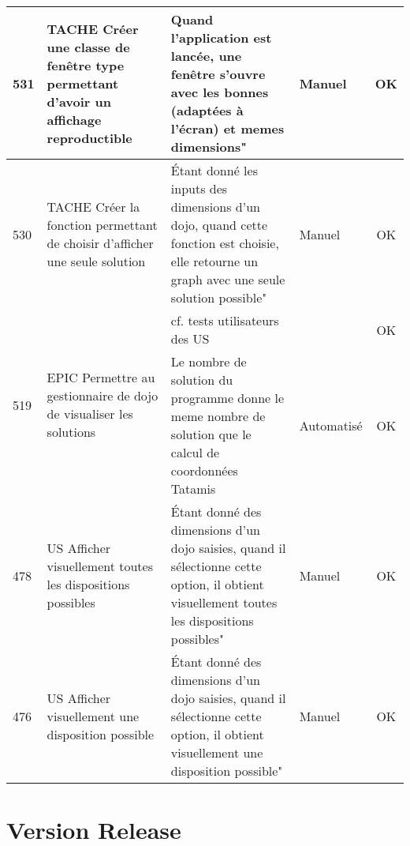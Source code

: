 \begin{adjustwidth}{-1.5cm}{0cm}
{\begin{tabular}{|m{0.6cm}|m{5.5cm}|m{8cm}|m{2cm}|c|}
            531                      & TACHE Créer une classe de fenêtre type permettant d'avoir un affichage reproductible            & Quand l'application est lancée, une fenêtre s'ouvre avec les bonnes (adaptées à l'écran) et memes dimensions"                                                    & Manuel          & OK       \\ \hline
            530                      & TACHE Créer la fonction permettant de choisir d'afficher une seule solution                     & Étant donné les inputs des dimensions d'un dojo, quand cette fonction est choisie, elle retourne un graph avec une seule solution possible"                      & Manuel          & OK       \\ \hline
            \multirow{2}{0.6cm}{519} & \multirow{2}{5.5cm}{EPIC Permettre au gestionnaire de dojo de visualiser les solutions}         & cf. tests utilisateurs des US                                                                                                                                    &                 & OK       \\ \cline{3-5}
                                     &                                                                                                 & Le nombre de solution du programme donne le meme nombre de solution que le calcul de coordonnées Tatamis                                                         & Automatisé      & OK       \\ \hline
            478                      & US Afficher visuellement toutes les dispositions possibles                                      & Étant donné des dimensions d'un dojo saisies, quand il sélectionne cette option, il obtient visuellement toutes les dispositions possibles"                      & Manuel          & OK       \\ \hline
            476                      & US Afficher visuellement une disposition possible                                               & Étant donné des dimensions d'un dojo saisies, quand il sélectionne cette option, il obtient visuellement une disposition possible"                               & Manuel          & OK       \\ \hline
        \end{tabular}}
\end{adjustwidth}



\section{Version Release}


